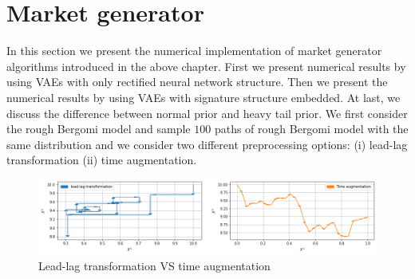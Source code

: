 \documentclass[12pt]{report}
\theoremstyle{definition}
\theoremstyle{remark}
\begin{document}
\section{Market generator}
In this section we present the numerical implementation of market generator algorithms introduced in the above chapter. First we present numerical results by using VAEs with only rectified neural network structure. Then we present the numerical results by using VAEs with signature structure embedded. At last, we discuss the difference between normal prior and heavy tail prior. We first consider the rough Bergomi model and sample $100$ paths of rough Bergomi model with the same distribution and we consider two different preprocessing options: (i) lead-lag transformation (ii) time augmentation.
 \begin{figure}[H]
    \centering
    \includegraphics[width=\textwidth]{figs/cvae5.png}
    \caption{Lead-lag transformation VS time augmentation}
\end{figure}
\end{document}

